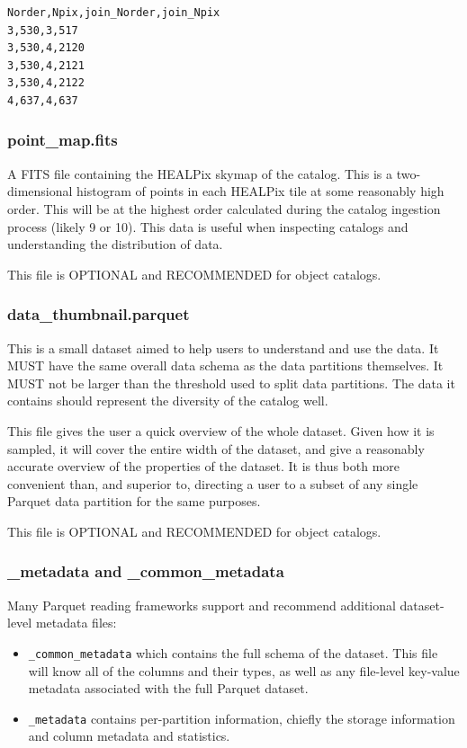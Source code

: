 \documentclass[11pt,a4paper]{ivoa}
\begin{document}
\begin{minipage}{\linewidth}
\begin{lstlisting}[caption=Example \texttt{partition\_join\_info.csv} file contents, label=fig:examplePartitionJoinInfoCsv]    
Norder,Npix,join_Norder,join_Npix
3,530,3,517
3,530,4,2120
3,530,4,2121
3,530,4,2122
4,637,4,637
\end{lstlisting}
\end{minipage}

\subsubsection{point\_map.fits} 

A FITS file containing the HEALPix skymap of the catalog.
This is a two-dimensional histogram of points in each HEALPix tile at some reasonably high order.
This will be at the highest order calculated during the catalog ingestion process (likely 9 or 10). 
This data is useful when inspecting catalogs and understanding the distribution of data. 

This file is OPTIONAL and RECOMMENDED for object catalogs.

\subsubsection{data\_thumbnail.parquet} 
This is a small dataset aimed to help users to understand and use the data. 
It MUST have the same overall data schema as the data partitions themselves.
It MUST not be larger than the threshold used to split data partitions.
The data it contains should represent the diversity of the catalog well. \par

This file gives the user a quick overview of the whole dataset.
Given how it is sampled, it will cover the entire width of the dataset, and give a reasonably accurate overview of the properties of the dataset. 
It is thus both more convenient than, and superior to, directing a user to a subset of any single Parquet data partition for the same purposes.

This file is OPTIONAL and RECOMMENDED for object catalogs.

\subsubsection{\_metadata and \_common\_metadata} 

Many Parquet reading frameworks support and recommend additional dataset-level metadata files:
\begin{itemize}
    \item \texttt{\_common\_metadata} which contains the full schema of the dataset. 
    This file will know all of the columns and their types, as well as any file-level key-value metadata associated with the full Parquet dataset.
    \item \texttt{\_metadata} contains per-partition information, chiefly the storage information and column metadata and statistics.
\end{itemize}
\end{document}
